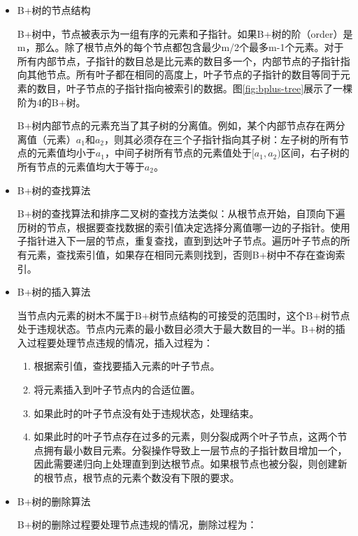 \begin{itemize}

\item B+树的节点结构

B+树中，节点被表示为一组有序的元素和子指针。如果B+树的阶（order）是m，那么。除了根节点外的每个节点都包含最少m/2个最多m-1个元素。对于所有内部节点，子指针的数目总是比元素的数目多一个，内部节点的子指针指向其他节点。所有叶子都在相同的高度上，叶子节点的子指针的数目等同于元素的数目，叶子节点的子指针指向被索引的数据。图\ref{fig:bplus-tree}展示了一棵阶为4的B+树。

B+树内部节点的元素充当了其子树的分离值。例如，某个内部节点存在两分离值（元素）$a_1$和$a_2$，则其必须存在三个子指针指向其子树：左子树的所有节点的元素值均小于$a_1$，中间子树所有节点的元素值处于$[a_1,a_2)$区间，右子树的所有节点的元素值均大于等于$a_2$。

\item B+树的查找算法

B+树的查找算法和排序二叉树的查找方法类似：从根节点开始，自顶向下遍历树的节点，根据要查找数据的索引值决定选择分离值哪一边的子指针。使用子指针进入下一层的节点，重复查找，直到到达叶子节点。遍历叶子节点的所有元素，查找索引值，如果存在相同元素则找到，否则B+树中不存在查询索引。

\item B+树的插入算法

当节点内元素的树木不属于B+树节点结构的可接受的范围时，这个B+树节点处于违规状态。节点内元素的最小数目必须大于最大数目的一半。B+树的插入过程要处理节点违规的情况，插入过程为：
\begin{enumerate}
\item 根据索引值，查找要插入元素的叶子节点。
\item 将元素插入到叶子节点内的合适位置。
\item 如果此时的叶子节点没有处于违规状态，处理结束。
\item 如果此时的叶子节点存在过多的元素，则分裂成两个叶子节点，这两个节点拥有最小数目元素。分裂操作导致上一层节点的子指针数目增加一个，因此需要递归向上处理直到到达根节点。如果根节点也被分裂，则创建新的根节点，根节点的元素个数没有下限的要求。
\end{enumerate}

\item B+树的删除算法

B+树的删除过程要处理节点违规的情况，删除过程为：


\end{itemize}
